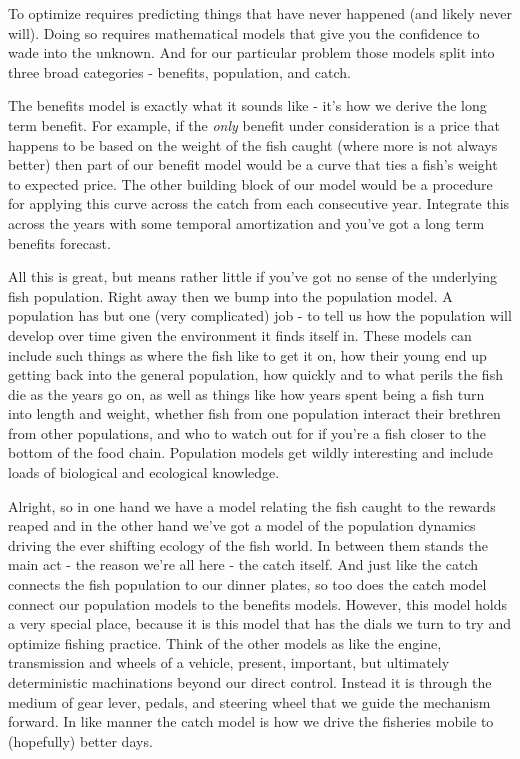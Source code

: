 \documentclass[11pt,a5paper]{book}
\begin{document}
To optimize requires predicting things that have never happened (and likely never will). Doing so requires mathematical models that give you the confidence to wade into the unknown. And for our particular problem those models split into three broad categories - benefits, population, and catch. 
\newline

The benefits model is exactly what it sounds like - it's how we derive the long term benefit. For example, if the \textit{only} benefit under consideration is a price that happens to be based on the weight of the fish caught (where more is not always better) then part of our benefit model would be a curve that ties a fish's weight to expected price. The other building block of our model would be a procedure for applying this curve across the catch from each consecutive year. Integrate this across the years with some temporal amortization and you've got a long term benefits forecast. 
\newline

All this is great, but means rather little if you've got no sense of the underlying fish population. Right away then we bump into the population model. A population has but one (very complicated) job - to tell us how the population will develop over time given the environment it finds itself in. These models can include such things as where the fish like to get it on, how their young end up getting back into the general population, how quickly and to what perils the fish die as the years go on, as well as things like how years spent being a fish turn into length and weight, whether fish from one population interact their brethren from other populations, and who to watch out for if you're a fish closer to the bottom of the food chain. Population models get wildly interesting and include loads of biological and ecological knowledge. 
\newline

Alright, so in one hand we have a model relating the fish caught to the rewards reaped and in the other hand we've got a model of the population dynamics driving the ever shifting ecology of the fish world. In between them stands the main act - the reason we're all here - the catch itself. And just like the catch connects the fish population to our dinner plates, so too does the catch model connect our population models to the benefits models. However, this model holds a very special place, because it is this model that has the dials we turn to try and optimize fishing practice. Think of the other models as like the engine, transmission and wheels of a vehicle, present, important, but ultimately deterministic machinations beyond our direct control. Instead it is through the medium of gear lever, pedals, and steering wheel that we guide the mechanism forward. In like manner the catch model is how we drive the fisheries mobile to (hopefully) better days. 
\newpage
\end{document}
